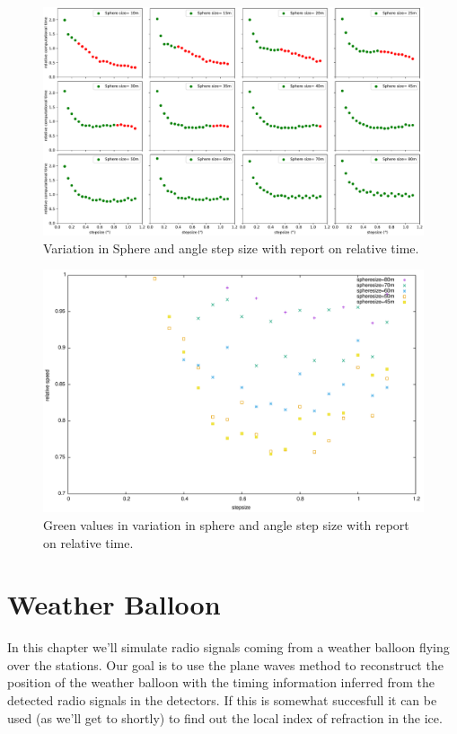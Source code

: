 \documentclass[11pt,a4paper,faculty=we,language=en,doctype=report]{cls/ugent-doc}
\begin{document}
\begin{figure}
	\includegraphics[width=\textwidth]{figures/subplotofallstepsphere.pdf}
	\caption{Variation in Sphere and angle step size with report on relative time.}
	\label{fig:SphereStepInfl}
\end{figure}

\begin{figure}
	\includegraphics[width=\textwidth]{figures/SphereAndStepFinal.pdf}
	\caption{Green values in variation in sphere and angle step size with report on relative time.}
	\label{fig:SphereStepFinal}
\end{figure}

\chapter{Weather Balloon}
\label{chap:WB}
In this chapter we'll simulate radio signals coming from a weather
balloon flying over the stations. Our goal is to use the plane waves 
method to reconstruct the position of the weather balloon with the
timing information inferred from the detected radio signals in the
detectors.
If this is somewhat succesfull it can be used (as we'll get to
shortly) to find out the local index of refraction in the ice.
\end{document}
